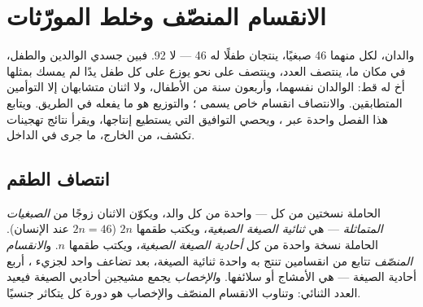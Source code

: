 \chapter{الانقسام المنصّف وخلط المورّثات}\label{ch:g12:meiosis-genetic-shuffling}

والدان، لكل منهما 46 صبغيًا، ينتجان طفلًا له 46 --- لا 92. فبين جسدي
الوالدين والطفل، في مكان ما، ينتصف العدد، وينتصف على نحو يوزع على كل
طفل يدًا لم يمسك بمثلها أخ له قط: الوالدان نفسهما، وأربعون سنة من
الأطفال، ولا اثنان متشابهان إلا التوأمين المتطابقين. والانتصاف انقسام
خاص يسمى ؛ والتوزيع هو ما يفعله  في الطريق.
ويتابع هذا الفصل  واحدة عبر ، ويحصي التوافيق التي
يستطيع إنتاجها، ويقرأ نتائج تهجينات تكشف، من الخارج، ما جرى في الداخل.

\section{انتصاف الطقم}

\begin{definition}\label{def:g12:meiosis-genetic-shuffling:meiosis}
 الحاملة نسختين من كل  --- واحدة من كل والد، ويكوّن الاثنان
زوجًا من \emph{الصبغيات المتماثلة} --- هي  \emph{ثنائية الصيغة
الصبغية}، ويكتب طقمها $2n$ ($2n = 46$ عند
الإنسان).  الحاملة نسخة واحدة من كل  \emph{أحادية الصيغة
الصبغية}، ويكتب طقمها $n$. و\emph{الانقسام
المنصّف} تتابع من انقسامين تنتج به  واحدة ثنائية
الصيغة، بعد تضاعف واحد لجزيء ، أربع  أحادية الصيغة --- هي الأمشاج
أو سلائفها. و\emph{الإخصاب} يجمع مشيجين أحاديي الصيغة فيعيد العدد
الثنائي: وتناوب الانقسام المنصّف والإخصاب هو دورة كل  يتكاثر جنسيًا.
\end{definition}

